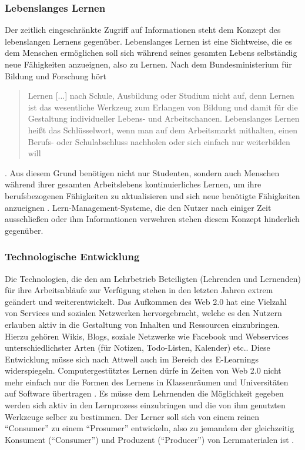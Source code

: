 \subsubsection{Lebenslanges Lernen}
Der zeitlich eingeschränkte Zugriff auf Informationen steht dem Konzept des lebenslangen Lernens gegenüber. Lebenslanges Lernen ist eine Sichtweise, die es dem Menschen ermöglichen soll sich während seines gesamten Lebens selbständig neue Fähigkeiten anzueignen, also zu Lernen. Nach dem Bundesministerium für Bildung und Forschung hört \begin{quotation}
Lernen [...] nach Schule, Ausbildung oder Studium nicht auf, denn Lernen ist das wesentliche Werkzeug zum Erlangen von Bildung und damit für die Gestaltung individueller Lebens- und Arbeitschancen. Lebenslanges Lernen heißt das Schlüsselwort, wenn man auf dem Arbeitsmarkt mithalten, einen Berufs- oder Schulabschluss nachholen oder sich einfach nur weiterbilden will 
\end{quotation} \cite{bmbf_lebenslanges_lernen}.
Aus diesem Grund benötigen nicht nur Studenten, sondern auch Menschen während ihrer gesamten Arbeitslebens kontinuierliches Lernen, um ihre berufsbezogenen Fähigkeiten zu aktualisieren und sich neue benötigte Fähigkeiten anzueignen \cite{Attwell2007}. Lern-Management-Systeme, die den Nutzer nach einiger Zeit ausschließen oder ihm Informationen verwehren stehen diesem Konzept hinderlich gegenüber.

\subsubsection{Technologische Entwicklung}\label{section:technologische_entwicklung}
Die Technologien, die den am Lehrbetrieb Beteiligten (Lehrenden und Lernenden) für ihre Arbeitsabläufe zur Verfügung stehen in den letzten Jahren extrem geändert und weiterentwickelt. Das Aufkommen des Web 2.0 hat eine Vielzahl von Services und sozialen Netzwerken hervorgebracht, welche es den Nutzern erlauben aktiv in die Gestaltung von Inhalten und Ressourcen einzubringen. Hierzu gehören Wikis, Blogs, soziale Netzwerke wie Facebook und Webservices unterschiedlichster Arten (für Notizen, Todo-Listen, Kalender) etc..
Diese Entwicklung müsse sich nach Attwell auch im Bereich des E-Learnings widerspiegeln. Computergestütztes Lernen dürfe in Zeiten von Web 2.0 nicht mehr einfach nur die Formen des Lernens in Klassenräumen und Universitäten auf Software übertragen \cite{Attwell2007}. Es müsse dem Lehrnenden die Möglichkeit gegeben werden sich aktiv in den Lernprozess einzubringen und die von ihm genutzten Werkzeuge selber zu bestimmen. Der Lerner soll sich von einem reinen "`Consumer"' zu einem "`Prosumer"' entwickeln, also zu jemandem der gleichzeitig Konsument ("`Consumer"') und Produzent ("`Producer"') von Lernmaterialen ist \cite{Schaffert2008a}.  

